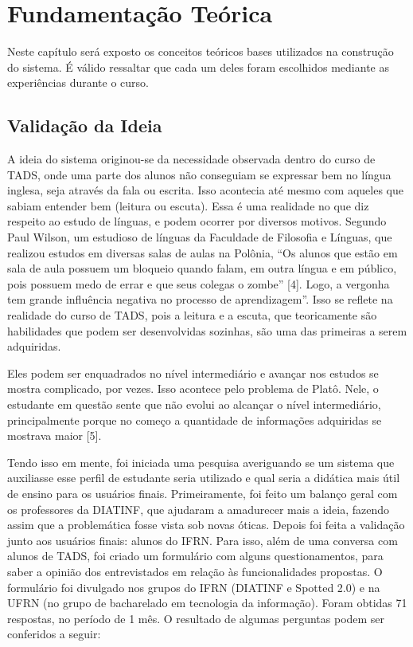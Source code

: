\chapter{Fundamentação Teórica}

Neste capítulo será exposto os conceitos teóricos bases utilizados na construção do sistema. É válido ressaltar que cada um deles foram escolhidos mediante as experiências durante o curso.


\section{Validação da Ideia}

A ideia do sistema originou-se da necessidade observada dentro do curso de TADS, onde uma parte dos alunos não conseguiam se expressar bem no língua inglesa, seja através da fala ou escrita. Isso acontecia até mesmo com aqueles que sabiam entender bem (leitura ou escuta). Essa é uma realidade no que diz respeito ao estudo de línguas, e podem ocorrer por diversos motivos. Segundo Paul Wilson, um estudioso de línguas da Faculdade de Filosofia e Línguas, que realizou estudos em diversas salas de aulas na Polônia, “Os alunos que estão em sala de aula possuem um bloqueio quando falam, em outra língua e em público, pois possuem medo de errar e que seus colegas o zombe” [4]. Logo, a vergonha tem grande influência negativa no processo de aprendizagem”. Isso se reflete na realidade do curso de TADS, pois a leitura e a escuta, que teoricamente são habilidades que podem ser desenvolvidas sozinhas, são uma das primeiras a serem adquiridas.

Eles podem ser enquadrados no nível intermediário e avançar nos estudos se mostra complicado, por vezes. Isso acontece pelo problema de Platô. Nele, o estudante em questão sente que não evolui ao alcançar o nível intermediário, principalmente porque no começo a quantidade de informações adquiridas se mostrava maior [5].

Tendo isso em mente, foi iniciada uma pesquisa averiguando se um sistema que auxiliasse esse perfil de estudante seria utilizado e qual seria a didática mais útil de ensino para os usuários finais. Primeiramente, foi feito um balanço geral com os professores da DIATINF, que ajudaram a amadurecer mais a ideia, fazendo assim que a problemática fosse vista sob novas óticas. Depois foi feita a validação junto aos usuários finais: alunos do IFRN. Para isso, além de uma conversa com alunos de TADS, foi criado um formulário com alguns questionamentos, para saber a opinião dos entrevistados em relação às funcionalidades propostas. O formulário foi divulgado nos grupos do IFRN (DIATINF e Spotted 2.0) e na UFRN (no grupo de bacharelado em tecnologia da informação). Foram obtidas 71 respostas, no período de 1 mês. O resultado de algumas perguntas podem ser conferidos a seguir:

